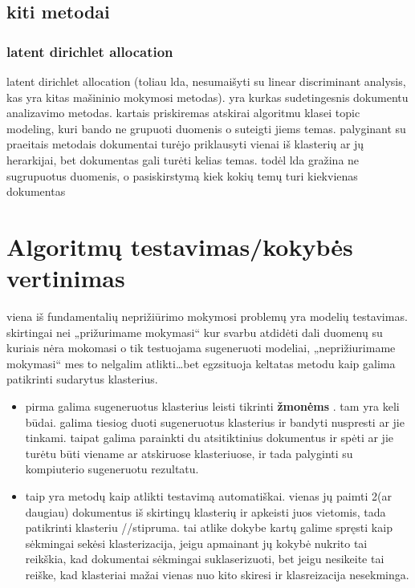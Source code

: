 \documentclass{VUMIFInfKursinis}
\begin{document}
	\subsection{kiti metodai}

		\subsubsection{latent dirichlet allocation}
			latent dirichlet allocation (toliau lda, nesumaišyti su linear discriminant analysis, kas yra kitas mašininio mokymosi metodas). yra kurkas sudetingesnis dokumentu analizavimo metodas. kartais priskiremas atskirai algoritmu klasei topic modeling, kuri bando ne grupuoti duomenis o suteigti jiems temas. palyginant su praeitais metodais dokumentai turėjo priklausyti vienai iš klasterių ar jų herarkijai, bet dokumentas gali turėti kelias temas. 
			todėl lda gražina ne sugrupuotus duomenis, o pasiskirstymą kiek kokių temų turi kiekvienas dokumentas  

\section{Algoritmų testavimas/kokybės vertinimas}
	viena iš fundamentalių neprižiūrimo mokymosi problemų yra modelių testavimas. skirtingai nei „prižurimame mokymasi“ kur svarbu atdidėti dali duomenų su kuriais nėra mokomasi o tik testuojama sugeneruoti modeliai, „neprižiurimame mokymasi“ mes to nelgalim atlikti\ldots bet egzsituoja keltatas metodu kaip galima patikrinti sudarytus klasterius.
	\begin{itemize}
		\item pirma galima sugeneruotus klasterius leisti tikrinti \textbf{žmonėms }. tam yra keli būdai. galima tiesiog duoti sugeneruotus klasterius ir bandyti nuspresti ar jie tinkami. taipat galima parainkti du atsitiktinius dokumentus ir spėti ar jie turėtu būti viename ar atskiruose klasteriuose, ir tada palyginti su kompiuterio sugeneruotu rezultatu. 
		\item taip yra metodų kaip atlikti testavimą automatiškai. vienas jų paimti 2(ar daugiau) dokumentus iš skirtingų klasterių ir apkeisti juos vietomis, tada patikrinti klasteriu //stipruma. tai atlike dokybe kartų galime spręsti kaip sėkmingai sekėsi klasterizacija, jeigu apmainant jų kokybė nukrito tai reikškia, kad dokumentai sėkmingai suklaserizuoti, bet jeigu nesikeite tai reiške, kad klasteriai mažai vienas nuo kito skiresi ir klasreizacija nesekminga.
	\end{itemize}
\end{document}
